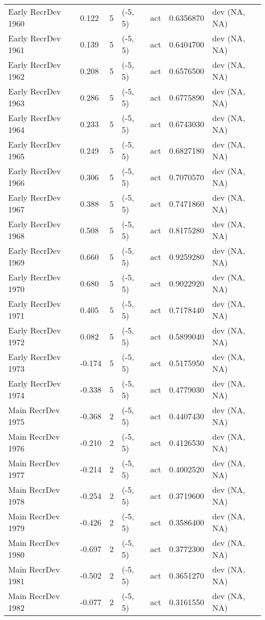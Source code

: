 \documentclass[11pt,
  english,
  letterpaper,
]{article}
\begin{document}
\begin{landscape}
\begin{longtable}[t]{>{\raggedright\arraybackslash}p{7cm}lllll>{\raggedright\arraybackslash}p{4cm}}
Early RecrDev 1960 & 0.122 & 5 & (-5, 5) & act & 0.6356870 & dev (NA, NA)\\
Early RecrDev 1961 & 0.139 & 5 & (-5, 5) & act & 0.6404700 & dev (NA, NA)\\
Early RecrDev 1962 & 0.208 & 5 & (-5, 5) & act & 0.6576500 & dev (NA, NA)\\
Early RecrDev 1963 & 0.286 & 5 & (-5, 5) & act & 0.6775890 & dev (NA, NA)\\
Early RecrDev 1964 & 0.233 & 5 & (-5, 5) & act & 0.6743030 & dev (NA, NA)\\
Early RecrDev 1965 & 0.249 & 5 & (-5, 5) & act & 0.6827180 & dev (NA, NA)\\
Early RecrDev 1966 & 0.306 & 5 & (-5, 5) & act & 0.7070570 & dev (NA, NA)\\
Early RecrDev 1967 & 0.388 & 5 & (-5, 5) & act & 0.7471860 & dev (NA, NA)\\
Early RecrDev 1968 & 0.508 & 5 & (-5, 5) & act & 0.8175280 & dev (NA, NA)\\
Early RecrDev 1969 & 0.660 & 5 & (-5, 5) & act & 0.9259280 & dev (NA, NA)\\
Early RecrDev 1970 & 0.680 & 5 & (-5, 5) & act & 0.9022920 & dev (NA, NA)\\
Early RecrDev 1971 & 0.405 & 5 & (-5, 5) & act & 0.7178440 & dev (NA, NA)\\
Early RecrDev 1972 & 0.082 & 5 & (-5, 5) & act & 0.5899040 & dev (NA, NA)\\
Early RecrDev 1973 & -0.174 & 5 & (-5, 5) & act & 0.5175950 & dev (NA, NA)\\
Early RecrDev 1974 & -0.338 & 5 & (-5, 5) & act & 0.4779030 & dev (NA, NA)\\
Main RecrDev 1975 & -0.368 & 2 & (-5, 5) & act & 0.4407430 & dev (NA, NA)\\
Main RecrDev 1976 & -0.210 & 2 & (-5, 5) & act & 0.4126530 & dev (NA, NA)\\
Main RecrDev 1977 & -0.214 & 2 & (-5, 5) & act & 0.4002520 & dev (NA, NA)\\
Main RecrDev 1978 & -0.254 & 2 & (-5, 5) & act & 0.3719600 & dev (NA, NA)\\
Main RecrDev 1979 & -0.426 & 2 & (-5, 5) & act & 0.3586400 & dev (NA, NA)\\
Main RecrDev 1980 & -0.697 & 2 & (-5, 5) & act & 0.3772300 & dev (NA, NA)\\
Main RecrDev 1981 & -0.502 & 2 & (-5, 5) & act & 0.3651270 & dev (NA, NA)\\
Main RecrDev 1982 & -0.077 & 2 & (-5, 5) & act & 0.3161550 & dev (NA, NA)\\

\end{longtable}
\end{landscape}
\end{document}
